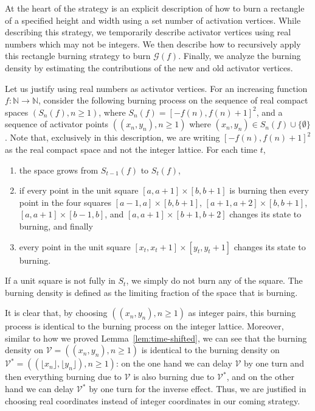 \documentclass[12pt]{article}
\theoremstyle{remark}
\providecommand{\N}{}
\renewcommand{\N}{{\mathbb N}}
\newcommand\cG{\mathcal G}
\newcommand\cV{\mathcal V}
\begin{document}
At the heart of the strategy is an explicit description of how to burn a rectangle of a specified height and width using a set number of activation vertices. While describing this strategy, we temporarily describe activator vertices using real numbers which may not be integers. We then describe how to recursively apply this rectangle burning strategy to burn $\cG(f)$. Finally, we analyze the burning density by estimating the contributions of the new and old activator vertices. 

Let us justify using real numbers as activator vertices. For an increasing function $f : \N \to \N$, consider the following burning process on the sequence of real compact spaces $(S_n(f), n \geq 1)$, where $S_n(f) = [-f(n), f(n)+1]^2$, and a sequence of activator points $((x_n,y_n), n \geq 1)$ where $(x_n,y_n) \in S_n(f) \cup \{\emptyset\}$. Note that, exclusively in this description, we are writing $[-f(n), f(n)+1]^2$ as the real compact space and not the integer lattice. For each time $t$,
\begin{enumerate}
    \item the space grows from $S_{t-1}(f)$ to $S_t(f)$,
    \item if every point in the unit square $[a, a+1] \times [b, b+1]$ is burning then every point in the four squares $[a-1, a] \times [b, b+1]$, $[a+1, a+2] \times [b, b+1]$, $[a, a+1] \times [b-1, b]$, and $[a, a+1] \times [b+1, b+2]$ changes its state to burning, and finally
    \item every point in the unit square $[x_t, x_{t}+1] \times [y_t, y_{t}+1]$ changes its state to burning.
\end{enumerate}
If a unit square is not fully in $S_t$, we simply do not burn any of the square. The burning density is defined as the limiting fraction of the space that is burning. 

It is clear that, by choosing $((x_n,y_n), n \geq 1)$ as integer pairs, this burning process is identical to the burning process on the integer lattice. Moreover, similar to how we proved Lemma~\ref{lem:time-shifted}, we can see that the burning density on $\cV = ((x_n,y_n), n \geq 1)$ is identical to the burning density on $\cV^* = ((\lfloor x_n \rfloor, \lfloor y_n \rfloor), n \geq 1)$: on the one hand we can delay $\cV$ by one turn and then everything burning due to $\cV$ is also burning due to $\cV^*$, and on the other hand we can delay $\cV^*$ by one turn for the inverse effect. Thus, we are justified in choosing real coordinates instead of integer coordinates in our coming strategy. 
\end{document}
